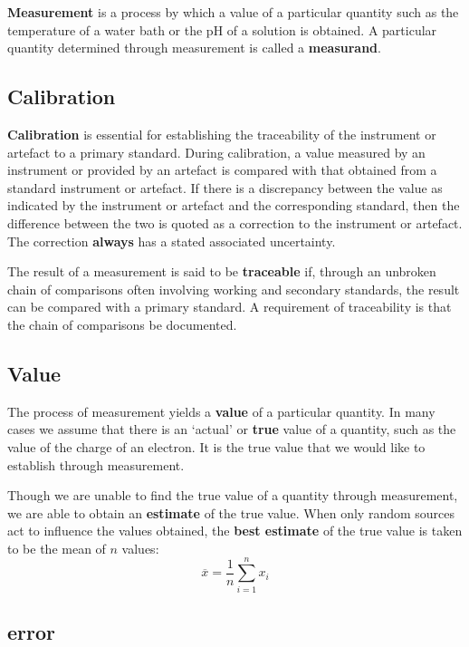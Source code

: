 \textbf{Measurement} is a process by which a value of a particular quantity such as the temperature of a water bath or the pH of a solution is obtained. A particular quantity determined through measurement is called a \textbf{measurand}. 

\subsection{Calibration}

\textbf{Calibration} is essential for establishing the traceability of the instrument or artefact to a primary standard. During calibration, a value measured by an instrument or provided by an artefact is compared with that obtained from a standard instrument or artefact. If there is a discrepancy between the value as indicated by the instrument or artefact and the corresponding standard, then the difference between the two is quoted as a correction to the instrument or artefact. The correction \textbf{always} has a stated associated uncertainty.

The result of a measurement is said to be \textbf{traceable} if, through an unbroken chain of comparisons often involving working and secondary standards, the result can be compared with a primary standard. A requirement of traceability is that the chain of comparisons be documented.


\subsection{Value}

The process of measurement yields a \textbf{value} of a particular quantity. In many cases we assume that there is an `actual' or \textbf{true} value of a quantity, such as the value of the charge of an electron. It is the true value that we would like to establish through measurement.

Though we are unable to find the true value of a quantity through measurement, we are able to obtain an \textbf{estimate} of the true value. When only random sources act to influence the values obtained, the \textbf{best estimate} of the true value is taken to be the mean of $n$ values:
\begin{equation}
    \overline{x} = \frac{1}{n}\sum_{i=1}^nx_i
\end{equation}


\subsection{error}

